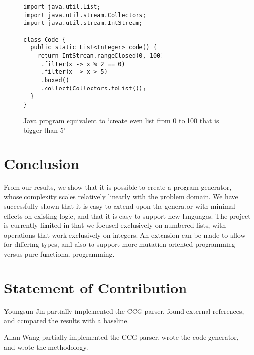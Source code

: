 \documentclass[11pt,letterpaper]{article}
\begin{document}
\begin{figure}
  \small
  \begin{verbatim}
import java.util.List;
import java.util.stream.Collectors;
import java.util.stream.IntStream;

class Code {
  public static List<Integer> code() {
    return IntStream.rangeClosed(0, 100)
     .filter(x -> x % 2 == 0)
     .filter(x -> x > 5)
     .boxed()
     .collect(Collectors.toList());
  }
}
  \end{verbatim}
  \caption{Java program equivalent to `create even list from 0 to 100 that is bigger than 5'}
\end{figure}

\section{Conclusion}

From our results, we show that it is possible to create a program generator, whose complexity scales relatively linearly with the problem domain.
We have successfully shown that it is easy to extend upon the generator with minimal effects on existing logic, and that it is easy to support new languages.
The project is currently limited in that we focused exclusively on numbered lists, with operations that work exclusively on integers.
An extension can be made to allow for differing types, and also to support more mutation oriented programming versus pure functional programming.

\nocite{*}



\section{Statement of Contribution}

Youngsun Jin partially implemented the CCG parser, found external references, and compared the results with a baseline.

Allan Wang partially implemented the CCG parser, wrote the code generator, and wrote the methodology.
\end{document}
